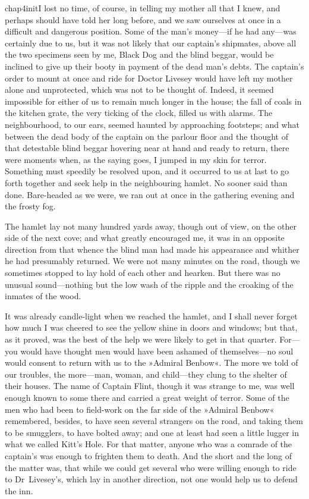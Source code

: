  
\lettrine[lines=5,image=true,findent=2pt]{chap4initI}{} lost no time, of course, in telling my mother all that I knew, and perhaps should have told her long before, and we saw ourselves at once in a difficult and dangerous position. Some of the man's money—if he had any—was certainly due to us, but it was not likely that our captain's shipmates, above all the two specimens seen by me, Black Dog and the blind beggar, would be inclined to give up their booty in payment of the dead man's debts. The captain's order to mount at once and ride for Doctor Livesey would have left my mother alone and unprotected, which was not to be thought of. Indeed, it seemed impossible for either of us to remain much longer in the house; the fall of coals in the kitchen grate, the very ticking of the clock, filled us with alarms. The neighbourhood, to our ears, seemed haunted by approaching footsteps; and what between the dead body of the captain on the parlour floor and the thought of that detestable blind beggar hovering near at hand and ready to return, there were moments when, as the saying goes, I jumped in my skin for terror. Something must speedily be resolved upon, and it occurred to us at last to go forth together and seek help in the neighbouring hamlet. No sooner said than done. Bare-headed as we were, we ran out at once in the gathering evening and the frosty fog.

The hamlet lay not many hundred yards away, though out of view, on the other side of the next cove; and what greatly encouraged me, it was in an opposite direction from that whence the blind man had made his appearance and whither he had presumably returned. We were not many minutes on the road, though we sometimes stopped to lay hold of each other and hearken. But there was no unusual sound—nothing but the low wash of the ripple and the croaking of the inmates of the wood.

It was already candle-light when we reached the hamlet, and I shall never forget how much I was cheered to see the yellow shine in doors and windows; but that, as it proved, was the best of the help we were likely to get in that quarter. For—you would have thought men would have been ashamed of themselves—no soul would consent to return with us to the »Admiral Benbow«. The more we told of our troubles, the more—man, woman, and child—they clung to the shelter of their houses. The name of Captain Flint, though it was strange to me, was well enough known to some there and carried a great weight of terror. Some of the men who had been to field-work on the far side of the »Admiral Benbow« remembered, besides, to have seen several strangers on the road, and taking them to be smugglers, to have bolted away; and one at least had seen a little lugger in what we called Kitt's Hole. For that matter, anyone who was a comrade of the captain's was enough to frighten them to death. And the short and the long of the matter was, that while we could get several who were willing enough to ride to Dr~Livesey's, which lay in another direction, not one would help us to defend the inn.

